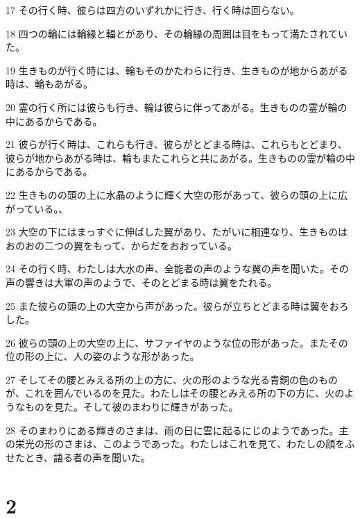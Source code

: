 \par 17 その行く時、彼らは四方のいずれかに行き、行く時は回らない。
\par 18 四つの輪には輪縁と輻とがあり、その輪縁の周囲は目をもって満たされていた。
\par 19 生きものが行く時には、輪もそのかたわらに行き、生きものが地からあがる時は、輪もあがる。
\par 20 霊の行く所には彼らも行き、輪は彼らに伴ってあがる。生きものの霊が輪の中にあるからである。
\par 21 彼らが行く時は、これらも行き、彼らがとどまる時は、これらもとどまり、彼らが地からあがる時は、輪もまたこれらと共にあがる。生きものの霊が輪の中にあるからである。
\par 22 生きものの頭の上に水晶のように輝く大空の形があって、彼らの頭の上に広がっている。、
\par 23 大空の下にはまっすぐに伸ばした翼があり、たがいに相連なり、生きものはおのおの二つの翼をもって、からだをおおっている。
\par 24 その行く時、わたしは大水の声、全能者の声のような翼の声を聞いた。その声の響きは大軍の声のようで、そのとどまる時は翼をたれる。
\par 25 また彼らの頭の上の大空から声があった。彼らが立ちとどまる時は翼をおろした。
\par 26 彼らの頭の上の大空の上に、サファイヤのような位の形があった。またその位の形の上に、人の姿のような形があった。
\par 27 そしてその腰とみえる所の上の方に、火の形のような光る青銅の色のものが、これを囲んでいるのを見た。わたしはその腰とみえる所の下の方に、火のようなものを見た。そして彼のまわりに輝きがあった。
\par 28 そのまわりにある輝きのさまは、雨の日に雲に起るにじのようであった。主の栄光の形のさまは、このようであった。わたしはこれを見て、わたしの顔をふせたとき、語る者の声を聞いた。

\chapter{2}

